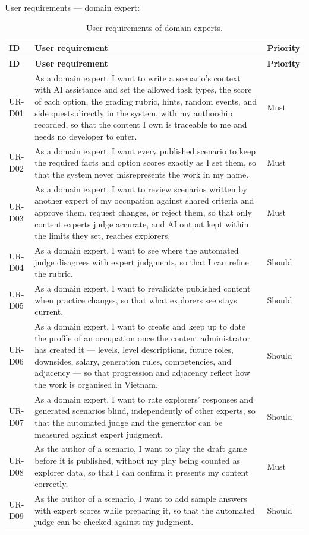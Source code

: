 User requirements --- domain expert:

{\small
\begin{longtable}{|>{\raggedright\arraybackslash}p{}|>{\raggedright\arraybackslash}p{}|>{\raggedright\arraybackslash}p{}|}
\caption{User requirements of domain experts.} \\
\hline
\textbf{ID} & \textbf{User requirement} & \textbf{Priority} \\ \hline
\endfirsthead
\hline
\textbf{ID} & \textbf{User requirement} & \textbf{Priority} \\ \hline
\endhead
UR-D01 & As a domain expert, I want to write a scenario's context with AI assistance and set the allowed task types, the score of each option, the grading rubric, hints, random events, and side quests directly in the system, with my authorship recorded, so that the content I own is traceable to me and needs no developer to enter. & Must \\ \hline
UR-D02 & As a domain expert, I want every published scenario to keep the required facts and option scores exactly as I set them, so that the system never misrepresents the work in my name. & Must \\ \hline
UR-D03 & As a domain expert, I want to review scenarios written by another expert of my occupation against shared criteria and approve them, request changes, or reject them, so that only content experts judge accurate, and AI output kept within the limits they set, reaches explorers. & Must \\ \hline
UR-D04 & As a domain expert, I want to see where the automated judge disagrees with expert judgments, so that I can refine the rubric. & Should \\ \hline
UR-D05 & As a domain expert, I want to revalidate published content when practice changes, so that what explorers see stays current. & Should \\ \hline
UR-D06 & As a domain expert, I want to create and keep up to date the profile of an occupation once the content administrator has created it --- levels, level descriptions, future roles, downsides, salary, generation rules, competencies, and adjacency --- so that progression and adjacency reflect how the work is organised in Vietnam. & Should \\ \hline
UR-D07 & As a domain expert, I want to rate explorers' responses and generated scenarios blind, independently of other experts, so that the automated judge and the generator can be measured against expert judgment. & Should \\ \hline
UR-D08 & As the author of a scenario, I want to play the draft game before it is published, without my play being counted as explorer data, so that I can confirm it presents my content correctly. & Must \\ \hline
UR-D09 & As the author of a scenario, I want to add sample answers with expert scores while preparing it, so that the automated judge can be checked against my judgment. & Should \\ \hline
\end{longtable}
}

